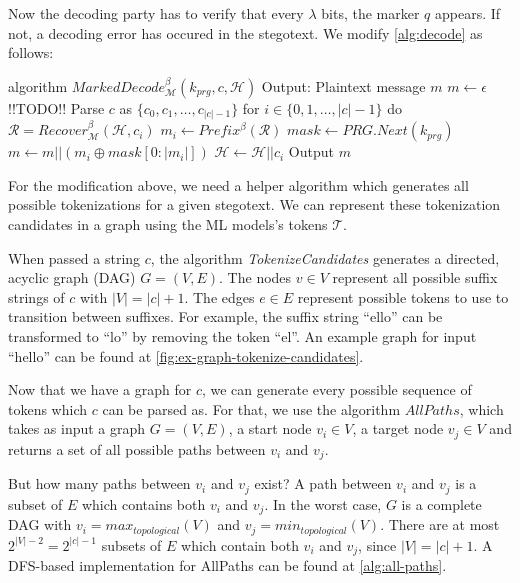 Now the decoding party has to verify that every $\lambda$ bits, the marker $q$ appears.
If not, a decoding error has occured in the stegotext.
We modify \autoref{alg:decode} as follows:


\begin{Pseudocode}[float, caption={Marked Decode Algorithm}, label={alg:marked-decode}]
algorithm $MarkedDecode_{\mathcal{M}}^\beta(k_{prg}, c, \mathcal{H})$
	Output: Plaintext message $m$
	$m \leftarrow \epsilon$
	!!TODO!!
	Parse $c$ as $\{ c_0, c_1, \dots, c_{|c|-1} \}$
	for $i \in \{0, 1, \dots, |c|-1 \}$ do
		$\mathcal{R} = Recover_{\mathcal{M}}^\beta(\mathcal{H}, c_i)$
		$m_i \leftarrow Prefix^\beta(\mathcal{R})$
		$mask \leftarrow PRG.Next(k_{prg})$
		$m \leftarrow m || (m_i \oplus mask[0: |m_i|])$
		$\mathcal{H} \leftarrow \mathcal{H}||c_i$
	Output $m$
\end{Pseudocode}

For the modification above, we need a helper algorithm which generates all possible tokenizations for a given stegotext.
We can represent these tokenization candidates in a graph using the ML models's tokens $\mathcal{T}$.

When passed a string $c$, the algorithm \emph{TokenizeCandidates} generates a directed, acyclic graph (DAG) $G = (V, E)$.
The nodes $v \in V$ represent all possible suffix strings of $c$ with $|V| = |c| + 1$.
The edges $e \in E$ represent possible tokens to use to transition between suffixes.
For example, the suffix string ``ello'' can be transformed to ``lo'' by removing the token ``el''.
An example graph for input ``hello'' can be found at \ref{fig:ex-graph-tokenize-candidates}.

Now that we have a graph for $c$, we can generate every possible sequence of tokens which $c$ can be parsed as.
For that, we use the algorithm $AllPaths$, which takes as input a graph $G = (V, E)$, a start node $v_i \in V$, a target node $v_j \in V$ and returns a set of all possible paths between $v_i$ and $v_j$.

But how many paths between $v_i$ and $v_j$ exist? A path between $v_i$ and $v_j$ is a subset of $E$ which contains both $v_i$ and $v_j$.
In the worst case, $G$ is a complete DAG with $v_i = max_{topological}(V)$ and $v_j = min_{topological}(V)$.
There are at most $2^{|V|-2} = 2^{|c|-1}$ subsets of $E$ which contain both $v_i$ and $v_j$, since $|V| = |c|+1$.
A DFS-based implementation for AllPaths can be found at \autoref{alg:all-paths}.

